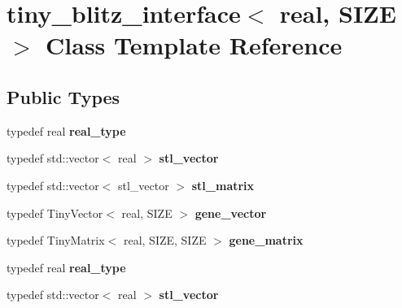 \hypertarget{classtiny__blitz__interface}{}\section{tiny\+\_\+blitz\+\_\+interface$<$ real, S\+I\+ZE $>$ Class Template Reference}
\label{classtiny__blitz__interface}
\subsection*{Public Types}
\begin{DoxyCompactItemize}
\item 
\mbox{\label{classtiny__blitz__interface_acfd69297ddbb8af88bd707da1a27d843}} 
typedef real {\bfseries real\+\_\+type}
\item 
\mbox{\label{classtiny__blitz__interface_a8db85916a5ba6cd2d828f06cd28e2404}} 
typedef std\+::vector$<$ real $>$ {\bfseries stl\+\_\+vector}
\item 
\mbox{\label{classtiny__blitz__interface_ae3ef50fdda40da89d49a441ca16dde65}} 
typedef std\+::vector$<$ stl\+\_\+vector $>$ {\bfseries stl\+\_\+matrix}
\item 
\mbox{\label{classtiny__blitz__interface_a7dea9c47f25a2261a2c50188a53ae325}} 
typedef Tiny\+Vector$<$ real, S\+I\+ZE $>$ {\bfseries gene\+\_\+vector}
\item 
\mbox{\label{classtiny__blitz__interface_a60f0848fb179cd855f521f07eeadc13e}} 
typedef Tiny\+Matrix$<$ real, S\+I\+ZE, S\+I\+ZE $>$ {\bfseries gene\+\_\+matrix}
\item 
\mbox{\label{classtiny__blitz__interface_acfd69297ddbb8af88bd707da1a27d843}} 
typedef real {\bfseries real\+\_\+type}
\item 
\mbox{\label{classtiny__blitz__interface_a8db85916a5ba6cd2d828f06cd28e2404}} 
typedef std\+::vector$<$ real $>$ {\bfseries stl\+\_\+vector}
\item 
\mbox{\label{classtiny__blitz__interface_ae3ef50fdda40da89d49a441ca16dde65}} 

\end{DoxyCompactItemize}
